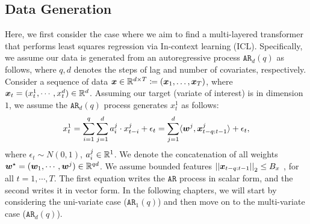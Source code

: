 \subsection{Data Generation}
Here, we first consider the case where we aim to find a multi-layered transformer that performs least squares regression via In-context learning (ICL).
Specifically, we assume our data is generated from an autoregressive process $\mathtt{AR}_d(q)$ as follows, where $q, d$ denotes the steps of lag and number of covariates, respectively. 
Consider a sequence of data 
$\bm{x} \in \mathbb{R}^{d \times T} \coloneqq (\bm{x}_1, \dots, \bm{x}_T)$, where $\bm{x}_t = (x_t^1, \cdots, x_t^d) \in \mathbb{R}^d$.
Assuming our target (variate of interest) is in dimension $1$, we assume the $\mathtt{AR}_d(q)$ process generates $x_t^1$ as follows:
\begin{equation}\label{eqn:AR-data}
    x_{t}^1
    =
    \sum_{i=1}^q
    \sum_{j=1}^d
    a_i^j \cdot x_{t-i}^j
    + \epsilon_t
    =
    \sum_{j=1}^d
    \langle \bm{w}^j , \bm{x}_{t-q: t-1}^j
    \rangle
    +
    \epsilon_t
    ,
\end{equation}
where $\epsilon_t \sim N(0, 1)$, $a_i^j \in \mathbb{R}^1$.
We denote the concatenation of all weights $\bm{w}^\star = (\bm{w}_1, \cdots, \bm{w}^j)\in \mathbb{R}^{qd}$.
We assume bounded features $\left\lvert \left\lvert\bm{x}_{t-q:t-1}\right\rvert \right\rvert_2 \leq B_x$ , for all $t = 1,\cdots, T$.
The first equation writes the $\mathtt{AR}$ process in scalar form, and the second writes it in vector form.
In the following chapters, we will start by considering the uni-variate case ($\mathtt{AR}_1(q)$) and then move on to the multi-variate case ($\mathtt{AR}_d(q)$).
\vspace{-1.5em}
